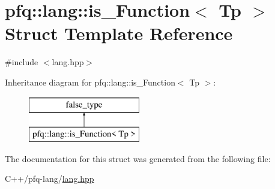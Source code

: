 \hypertarget{structpfq_1_1lang_1_1is__Function}{\section{pfq\+:\+:lang\+:\+:is\+\_\+\+Function$<$ Tp $>$ Struct Template Reference}
\label{structpfq_1_1lang_1_1is__Function}
}


{\ttfamily \#include $<$lang.\+hpp$>$}

Inheritance diagram for pfq\+:\+:lang\+:\+:is\+\_\+\+Function$<$ Tp $>$\+:\begin{figure}[H]
\begin{center}
\leavevmode
\includegraphics[height=2.000000cm]{structpfq_1_1lang_1_1is__Function}
\end{center}
\end{figure}


The documentation for this struct was generated from the following file\+:\begin{DoxyCompactItemize}
\item 
C++/pfq-\/lang/\hyperlink{lang_8hpp}{lang.\+hpp}\end{DoxyCompactItemize}
